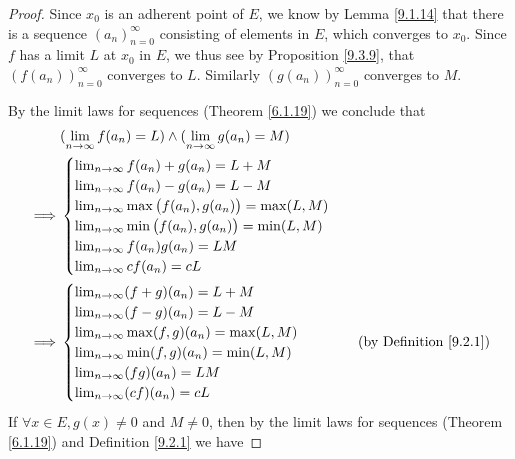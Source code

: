 \begin{proof}
    Since \(x_0\) is an adherent point of \(E\), we know by Lemma \ref{9.1.14} that there is a sequence \((a_n)_{n = 0}^\infty\) consisting of elements in \(E\), which converges to \(x_0\).
    Since \(f\) has a limit \(L\) at \(x_0\) in \(E\), we thus see by Proposition \ref{9.3.9}, that \((f(a_n))_{n = 0}^\infty\) converges to \(L\).
    Similarly \((g(a_n))_{n = 0}^\infty\) converges to \(M\).

    By the limit laws for sequences (Theorem \ref{6.1.19}) we conclude that
    \begin{align*}
                 & (\lim_{n \to \infty} f(a_n) = L) \land (\lim_{n \to \infty} g(a_n) = M) \\
        \implies & \begin{cases}
                       \lim_{n \to \infty} f(a_n) + g(a_n) = L + M                   \\
                       \lim_{n \to \infty} f(a_n) - g(a_n) = L - M                   \\
                       \lim_{n \to \infty} \max\big(f(a_n), g(a_n)\big) = \max(L, M) \\
                       \lim_{n \to \infty} \min\big(f(a_n), g(a_n)\big) = \min(L, M) \\
                       \lim_{n \to \infty} f(a_n) g(a_n) = LM                        \\
                       \lim_{n \to \infty} cf(a_n) = cL
                   \end{cases}           \\
        \implies & \begin{cases}
                       \lim_{n \to \infty} (f + g)(a_n) = L + M         \\
                       \lim_{n \to \infty} (f - g)(a_n) = L - M         \\
                       \lim_{n \to \infty} \max(f, g)(a_n) = \max(L, M) \\
                       \lim_{n \to \infty} \min(f, g)(a_n) = \min(L, M) \\
                       \lim_{n \to \infty} (fg)(a_n) = LM               \\
                       \lim_{n \to \infty} (cf)(a_n) = cL
                   \end{cases}                     & \text{(by Definition \ref{9.2.1})}
    \end{align*}
    If \(\forall x \in E, g(x) \neq 0\) and \(M \neq 0\), then by the limit laws for sequences (Theorem \ref{6.1.19}) and Definition \ref{9.2.1} we have

\end{proof}
